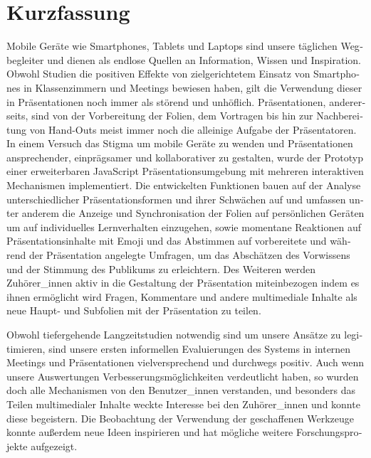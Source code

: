\chapter{Kurzfassung}

\begin{german}
Mobile Geräte wie Smartphones, Tablets und Laptops sind unsere täglichen Wegbegleiter und dienen als endlose Quellen an Information, Wissen und Inspiration. Obwohl Studien die positiven Effekte von zielgerichtetem Einsatz von Smartphones in Klassenzimmern und Meetings bewiesen haben, gilt die Verwendung dieser in Präsentationen noch immer als störend und unhöflich. Präsentationen, andererseits, sind von der Vorbereitung der Folien, dem Vortragen bis hin zur Nachbereitung von Hand-Outs meist immer noch die alleinige Aufgabe der Präsentatoren. In einem Versuch das Stigma um mobile Geräte zu wenden und Präsentationen ansprechender, einprägsamer und kollaborativer zu gestalten, wurde der Prototyp einer erweiterbaren JavaScript Präsentationsumgebung mit mehreren interaktiven Mechanismen implementiert. Die entwickelten Funktionen bauen auf der Analyse unterschiedlicher Präsentationsformen und ihrer Schwächen auf und umfassen unter anderem die Anzeige und Synchronisation der Folien auf persönlichen Geräten um auf individuelles Lernverhalten einzugehen, sowie momentane Reaktionen auf Präsentationsinhalte mit Emoji und das Abstimmen auf vorbereitete und während der Präsentation angelegte Umfragen, um das Abschätzen des Vorwissens und der Stimmung des Publikums zu erleichtern. Des Weiteren werden Zuhörer_innen aktiv in die Gestaltung der Präsentation miteinbezogen indem es ihnen ermöglicht wird Fragen, Kommentare und andere multimediale Inhalte als neue Haupt- und Subfolien mit der Präsentation zu teilen.

Obwohl tiefergehende Langzeitstudien notwendig sind um unsere Ansätze zu legitimieren, sind unsere ersten informellen Evaluierungen des Systems in internen Meetings und Präsentationen vielversprechend und durchwegs positiv. Auch wenn unsere Auswertungen Verbesserungsmöglichkeiten verdeutlicht haben, so wurden doch alle Mechanismen von den Benutzer_innen verstanden, und besonders das Teilen multimedialer Inhalte weckte Interesse bei den Zuhörer_innen und konnte diese begeistern. Die Beobachtung der Verwendung der geschaffenen Werkzeuge konnte außerdem neue Ideen inspirieren und hat mögliche weitere Forschungsprojekte aufgezeigt.
\end{german}